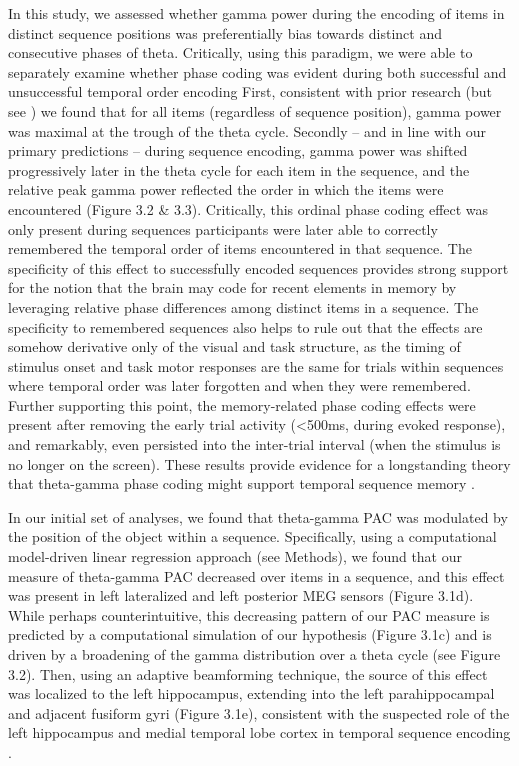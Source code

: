 In this study, we assessed whether gamma power during the encoding of
items in distinct sequence positions was preferentially bias towards
distinct and consecutive phases of theta. Critically, using this
paradigm, we were able to separately examine whether phase coding was
evident during both successful and unsuccessful temporal order encoding
First, consistent with prior research
\autocites{canolty_high_2006}{jacobs_neural_2009}{voytek_shifts_2010}
(but see \textcite{axmacher_cross-frequency_2010}) we found that for all
items (regardless of sequence position), gamma power was maximal at the
trough of the theta cycle. Secondly -- and in line with our primary
predictions -- during sequence encoding, gamma power was shifted
progressively later in the theta cycle for each item in the sequence,
and the relative peak gamma power reflected the order in which the items
were encountered (Figure 3.2 \& 3.3). Critically, this ordinal phase
coding effect was only present during sequences participants were later
able to correctly remembered the temporal order of items encountered in
that sequence. The specificity of this effect to successfully encoded
sequences provides strong support for the notion that the brain may code
for recent elements in memory by leveraging relative phase differences
among distinct items in a sequence. The specificity to remembered
sequences also helps to rule out that the effects are somehow derivative
only of the visual and task structure, as the timing of stimulus onset
and task motor responses are the same for trials within sequences where
temporal order was later forgotten and when they were remembered.
Further supporting this point, the memory-related phase coding effects
were present after removing the early trial activity (\textless{}500ms,
during evoked response), and remarkably, even persisted into the
inter-trial interval (when the stimulus is no longer on the screen).
These results provide evidence for a longstanding theory that
theta-gamma phase coding might support temporal sequence memory
\autocite{lisman_-_2013}.

In our initial set of analyses, we found that theta-gamma PAC was
modulated by the position of the object within a sequence. Specifically,
using a computational model-driven linear regression approach (see
Methods), we found that our measure of theta-gamma PAC decreased over
items in a sequence, and this effect was present in left lateralized and
left posterior MEG sensors (Figure 3.1d). While perhaps
counterintuitive, this decreasing pattern of our PAC measure is
predicted by a computational simulation of our hypothesis (Figure 3.1c)
and is driven by a broadening of the gamma distribution over a theta
cycle (see Figure 3.2). Then, using an adaptive beamforming technique,
the source of this effect was localized to the left hippocampus,
extending into the left parahippocampal and adjacent fusiform gyri
(Figure 3.1e), consistent with the suspected role of the left
hippocampus and medial temporal lobe cortex in temporal sequence
encoding
\autocites{dubrow_temporal_2014}{hsieh_hippocampal_2014}{jenkins_prefrontal_2010}{tubridy_medial_2011}.

